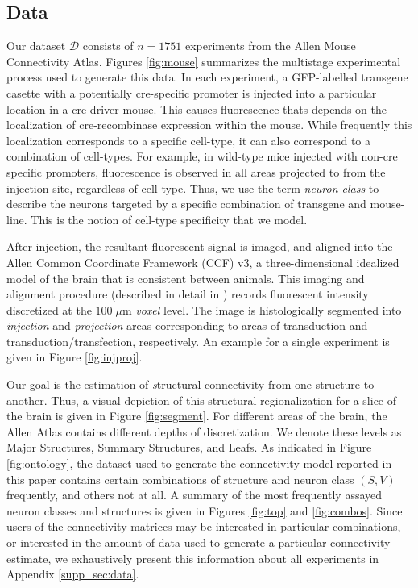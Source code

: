 \subsection{Data}

Our dataset $\mathcal D$ consists of $n=1751$ experiments from the Allen Mouse Connectivity Atlas.
Figures \ref{fig:mouse} summarizes the multistage experimental process used to generate this data.
In each experiment, a GFP-labelled transgene casette with a potentially cre-specific promoter is injected into a particular location in a cre-driver mouse.
This causes fluorescence thats depends on the localization of cre-recombinase expression within the mouse.
While frequently this localization corresponds to a specific cell-type, it can also correspond to a combination of cell-types.
For example, in wild-type mice injected with non-cre specific promoters, fluorescence is observed in all areas projected to from the injection site, regardless of cell-type.
Thus, we use the term \textit{neuron class} to describe the neurons targeted by a specific combination of transgene and mouse-line.
This is the notion of cell-type specificity that we model.

After injection, the resultant fluorescent signal is imaged, and aligned into the Allen Common Coordinate Framework (CCF) v3, a three-dimensional idealized model of the brain that is consistent between animals.
This imaging and alignment procedure (described in detail in \citep{Harris2019-mr}) records fluorescent intensity discretized at the $100 \; \mu$m \textit{voxel} level. 
The image is histologically segmented into \textit{injection} and \textit{projection} areas corresponding to areas of transduction and transduction/transfection, respectively.
An example for a single experiment is given in Figure \ref{fig:injproj}.

Our goal is the estimation of {\textit structural connectivity} from one structure to another.
Thus, a visual depiction of this structural regionalization for a slice of the brain is given in Figure \ref{fig:segment}.
For different areas of the brain, the Allen Atlas contains different depths of discretization.
We denote these levels as Major Structures, Summary Structures, and Leafs.
As indicated in Figure \ref{fig:ontology}, the dataset used to generate the connectivity model reported in this paper contains certain combinations of structure and neuron class $(S,V)$ frequently, and others not at all.
A summary of the most frequently assayed neuron classes and structures is given in Figures \ref{fig:top} and \ref{fig:combos}.
Since users of the connectivity matrices may be interested in particular combinations, or interested in the amount of data used to generate a particular connectivity estimate, we exhaustively present this information about all experiments in Appendix \ref*{supp_sec:data}.

